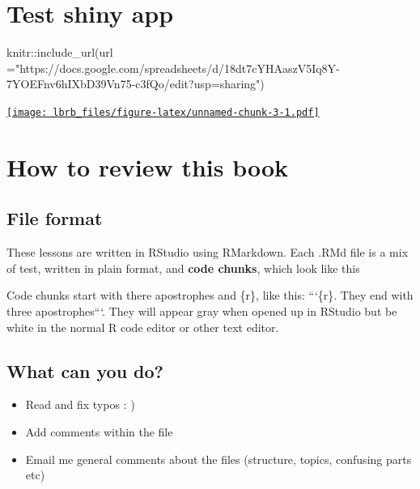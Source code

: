 \documentclass[
]{book}
\newenvironment{Shaded}{\begin{snugshade}}{\end{snugshade}}
\newcommand{\AttributeTok}[1]{\textcolor[rgb]{0.77,0.63,0.00}{#1}}
\newcommand{\FunctionTok}[1]{\textcolor[rgb]{0.00,0.00,0.00}{#1}}
\newcommand{\NormalTok}[1]{#1}
\newcommand{\SpecialCharTok}[1]{\textcolor[rgb]{0.00,0.00,0.00}{#1}}
\newcommand{\StringTok}[1]{\textcolor[rgb]{0.31,0.60,0.02}{#1}}
\providecommand{\tightlist}{%
  \setlength{\itemsep}{0pt}\setlength{\parskip}{0pt}}
\begin{document}
\hypertarget{test-shiny-app-1}{%
\chapter{Test shiny app}\label{test-shiny-app-1}}

\begin{Shaded}
\begin{Highlighting}[]
\NormalTok{knitr}\SpecialCharTok{::}\FunctionTok{include\_url}\NormalTok{(}\AttributeTok{url =}\StringTok{"https://docs.google.com/spreadsheets/d/18dt7cYHAaszV5Iq8Y{-}7YOEFnv6hIXbD39Vn75{-}c3fQo/edit?usp=sharing"}\NormalTok{)}
\end{Highlighting}
\end{Shaded}

\href{https://docs.google.com/spreadsheets/d/18dt7cYHAaszV5Iq8Y-7YOEFnv6hIXbD39Vn75-c3fQo/edit?usp=sharing}{\texttt{[image: lbrb\_files/figure-latex/unnamed-chunk-3-1.pdf]}}

\hypertarget{how-to-review-this-book}{%
\chapter{How to review this book}\label{how-to-review-this-book}}

\hypertarget{file-format}{%
\section{File format}\label{file-format}}

These lessons are written in RStudio using RMarkdown. Each .RMd file is a mix of test, written in plain format, and \textbf{code chunks}, which look like this

Code chunks start with there apostrophes and \{r\}, like this: ```\{r\}. They end with three apostrophes```. They will appear gray when opened up in RStudio but be white in the normal R code editor or other text editor.

\hypertarget{what-can-you-do}{%
\section{What can you do?}\label{what-can-you-do}}

\begin{itemize}
\tightlist
\item
  Read and fix typos : )
\item
  Add comments within the file
\item
  Email me general comments about the files (structure, topics, confusing parts etc)
\end{itemize}
\end{document}
